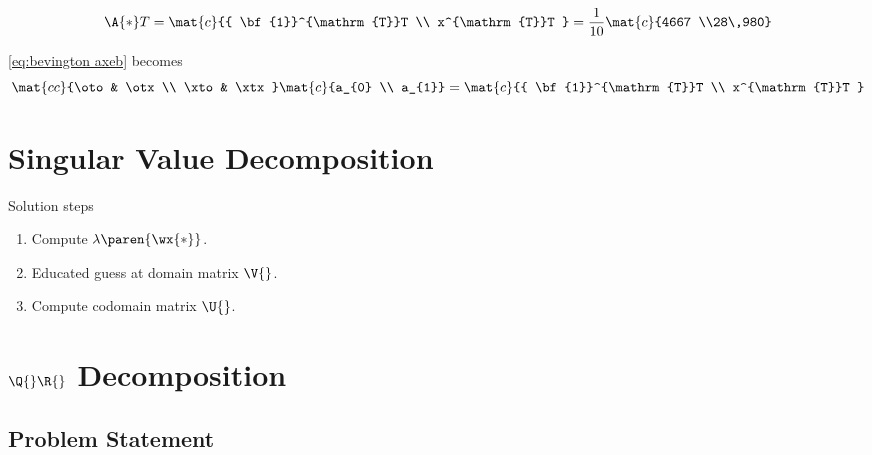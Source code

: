   \begin{equation*}   %
    \A{*}T = 
      \mat{c}{{ \bf{1}}^{\mathrm{T}}T \\ x^{\mathrm{T}}T } =
      \frac{1}{10} \mat{c}{4667 \\28\,980}
  \end{equation*}

\eqref{eq:bevington axeb} becomes
  \begin{equation}   %
    \mat{cc}{\oto & \otx \\ \xto & \xtx}
    \mat{c}{a_{0} \\ a_{1}} = 
    \mat{c}{{ \bf{1}}^{\mathrm{T}}T \\ x^{\mathrm{T}}T }
    \label{eq:bevington vectors}
  \end{equation}

\section{Singular Value Decomposition}  %
Solution steps
\begin{enumerate}
  \item Compute $\lambda\paren{\wx{*}}$.
  \item Educated guess at domain matrix $\V{}$.
  \item Compute codomain matrix $\U{}$.
\end{enumerate}



\section{$\Q{}\R{}$ Decomposition}  %

\subsection{Problem Statement}  %

\endinput
